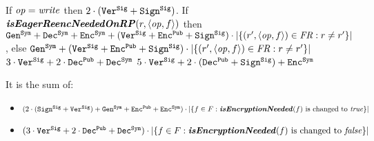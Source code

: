 {{              If \( \operation = \opwrite \) then \( 2 \cdot (\cverifysig + \csig) \). \newline
              If \( \isEagerReencNeededOnRPF \) then \( \cgensym + \cdecsym + \cencsym + (\cverifysig + \cencpub + \csig) \cdot \lvert \lbrace (\role', \twoang{\operation}{\file}) \in \frassignement : \role \neq \role' \rbrace \rvert \), else \( \cgensym + (\cverifysig + \cencpub + \csig) \cdot \lvert \lbrace (\role', \twoang{\operation}{\file}) \in \frassignement : \role \neq \role' \rbrace \rvert \)}
              {}
    \threecolsdel{\( \readF \)}
              {\( 3 \cdot \cverifysig + 2 \cdot \cdecpub + \cdecsym \)}
              {}
    \threecolsdel{\( \writeF \)}
              {\( 5 \cdot \cverifysig + 2 \cdot (\cdecpub + \csig) + \cencsym \)}
              {}
              {It is the sum of:
              \begin{itemize}
                \item \( (2 \cdot (\csig + \cverifysig) + \cgensym + \cencpub + \cencsym) \cdot \lvert \lbrace \file \in \files : \isEncryptionNeededF \textnormal{ is changed to } \mathit{true} \rbrace \rvert \)
                \item \( (3 \cdot \cverifysig + 2 \cdot \cdecpub + \cdecsym) \cdot \lvert \lbrace \file \in \files : \isEncryptionNeededF \textnormal{ is changed to } \mathit{false} \rbrace \rvert \)
              \end{itemize}}
              {}
}

